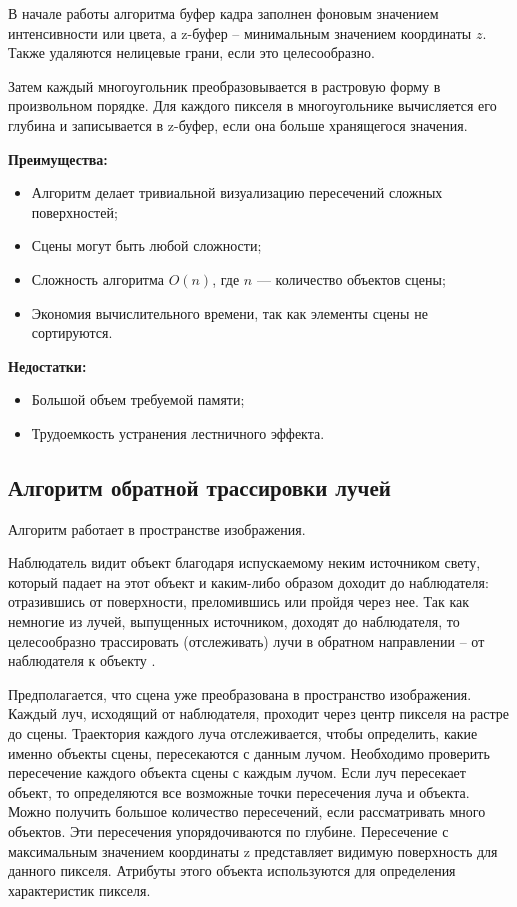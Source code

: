 В начале работы алгоритма буфер кадра заполнен фоновым значением интенсивности или цвета, а z-буфер – минимальным значением координаты $z$. Также удаляются нелицевые грани, если это целесообразно. 

Затем каждый многоугольник преобразовывается в растровую форму в произвольном порядке. Для каждого пикселя в многоугольнике вычисляется его глубина и записывается в z-буфер, если она больше хранящегося значения.

\textbf{Преимущества:}
\begin{itemize}[label=---]
	\item Алгоритм делает тривиальной визуализацию пересечений сложных поверхностей;
	\item Сцены могут быть любой сложности;
	\item Сложность алгоритма $O(n)$, где $n$ --- количество объектов сцены;
	\item Экономия вычислительного времени, так как элементы сцены не сортируются.
\end{itemize}

\textbf{Недостатки:}
\begin{itemize}[label=---]
	\item Большой объем требуемой памяти;
	\item Трудоемкость устранения лестничного эффекта.
\end{itemize}

\subsection{Алгоритм обратной трассировки лучей}

Алгоритм работает в пространстве изображения.

Наблюдатель видит объект благодаря испускаемому неким источником свету, который падает на этот объект и каким-либо образом доходит до наблюдателя: отразившись от поверхности, преломившись или пройдя через нее. Так как немногие из лучей, выпущенных источником, доходят до наблюдателя, то целесообразно трассировать (отслеживать) лучи в обратном направлении – от наблюдателя к объекту \cite{lectures}.

Предполагается, что сцена уже преобразована в пространство изображения. Каждый луч, исходящий от наблюдателя, проходит через центр пикселя на растре до сцены. Траектория каждого луча отслеживается, чтобы определить, какие именно объекты сцены, пересекаются с данным лучом. Необходимо проверить пересечение каждого объекта сцены с каждым лучом. Если луч пересекает объект, то определяются все возможные точки пересечения луча и объекта. Можно получить большое количество пересечений, если рассматривать много объектов. Эти пересечения упорядочиваются по глубине. Пересечение с максимальным значением координаты z представляет видимую поверхность для данного пикселя. Атрибуты этого объекта используются для определения характеристик пикселя. 


